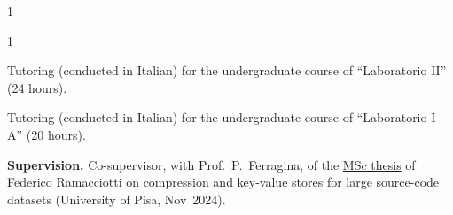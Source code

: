 \documentclass[10pt,a4paper,ragged2e,academicons]{altacv}
\begin{document}
\begin{paracol}{1}

\smallskip


\end{paracol}
\begin{paracol}{1} %


Tutoring (conducted in Italian) for the undergraduate course of ``Laboratorio II'' (24 hours).

\divider %


Tutoring (conducted in Italian) for the undergraduate course of ``Laboratorio I-A'' (20 hours).

\smallskip
\noindent\textbf{Supervision.} Co-supervisor, with Prof.~P.~Ferragina, of the \href{https://etd.adm.unipi.it/theses/available/etd-11132024-150728/}{MSc thesis} of Federico Ramacciotti on compression and key-value stores for large source-code datasets (University of Pisa, Nov~2024).

\end{paracol}
\end{document}
